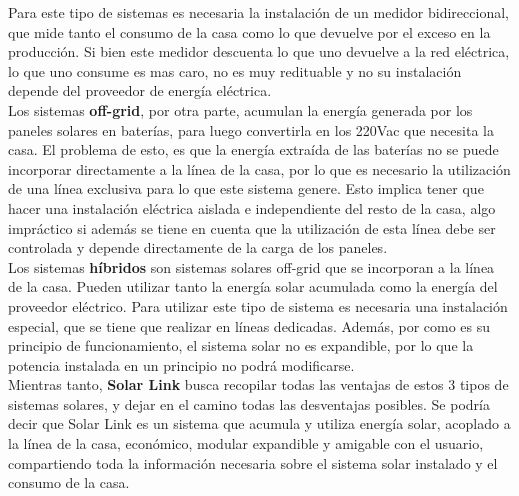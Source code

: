 Para este tipo de sistemas es necesaria la instalación de un medidor bidireccional, que mide tanto el consumo de la casa como lo que devuelve por el exceso en la producción. Si bien este medidor descuenta lo que uno devuelve a la red eléctrica, lo que uno consume es mas caro, no es muy redituable y no su instalación depende del proveedor de energía eléctrica.\\

Los sistemas \textbf{off-grid}, por otra parte, acumulan la energía generada por los paneles solares en baterías, para luego convertirla en los 220Vac que necesita la casa. El problema de esto, es que la energía extraída de las baterías no se puede incorporar directamente a la línea de la casa, por lo que es necesario la utilización de una línea exclusiva para lo que este sistema genere. Esto implica tener que hacer una instalación eléctrica aislada e independiente del resto de la casa, algo impráctico si además se tiene en cuenta que la utilización de esta línea debe ser controlada y depende directamente de la carga de los paneles.\\

Los sistemas \textbf{híbridos} son sistemas solares off-grid que se incorporan a la línea de la casa. Pueden utilizar tanto la energía solar acumulada como la energía del proveedor eléctrico. Para utilizar este tipo de sistema es necesaria una instalación especial, que se tiene que realizar en líneas dedicadas. Además, por como es su principio de funcionamiento, el sistema solar no es expandible, por lo que la potencia instalada en un principio no podrá modificarse.\\

Mientras tanto, \textbf{Solar Link} busca recopilar todas las ventajas de estos 3 tipos de sistemas solares, y dejar en el camino todas las desventajas posibles. Se podría decir que Solar Link es un sistema que acumula y utiliza energía solar, acoplado a la línea de la casa, económico, modular expandible y amigable con el usuario, compartiendo toda la información necesaria sobre el sistema solar instalado y el consumo de la casa.
